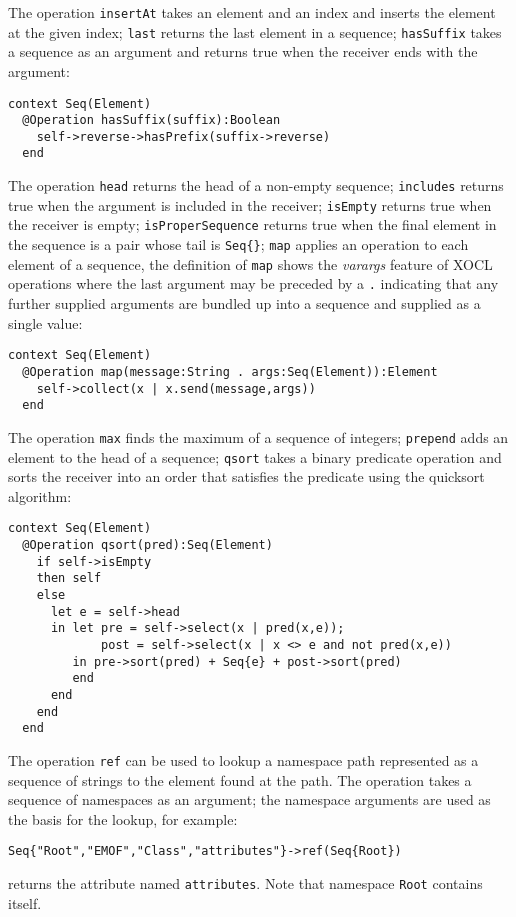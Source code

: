 \documentclass{article}
\begin{document}
The operation {\tt insertAt} takes an element and an index and inserts the element at the given index; 
{\tt last} returns the last element in a sequence; {\tt hasSuffix} takes a sequence as an argument and
returns true when the receiver ends with the argument:
\begin{verbatim}
context Seq(Element)
  @Operation hasSuffix(suffix):Boolean
    self->reverse->hasPrefix(suffix->reverse)
  end
\end{verbatim}
The operation {\tt head} returns the head of a non-empty sequence; {\tt includes} returns true when the 
argument is included in the receiver; {\tt isEmpty} returns true when the receiver is empty; {\tt isProperSequence}
returns true when the final element in the sequence is a pair whose tail is {\tt Seq\{\}}; {\tt map}
applies an operation to each element of a sequence, the definition of {\tt map} shows the {\em varargs} feature
of XOCL operations where the last argument may be preceded by a {\tt .} indicating that any further
supplied arguments are bundled up into a sequence and supplied as a single value:
\begin{verbatim}
context Seq(Element)
  @Operation map(message:String . args:Seq(Element)):Element
    self->collect(x | x.send(message,args))
  end
\end{verbatim}
The operation {\tt max} finds the maximum of a sequence of integers; {\tt prepend} adds an element to 
the head of a sequence; {\tt qsort} takes a binary predicate operation and sorts the receiver into an
order that satisfies the predicate using the quicksort algorithm:
\begin{verbatim}
context Seq(Element)
  @Operation qsort(pred):Seq(Element)
    if self->isEmpty
    then self
    else 
      let e = self->head
      in let pre = self->select(x | pred(x,e));
             post = self->select(x | x <> e and not pred(x,e))
         in pre->sort(pred) + Seq{e} + post->sort(pred)
         end
      end
    end
  end
\end{verbatim}
The operation {\tt ref} can be used to lookup a namespace path represented as a sequence of strings
to the element found at the path. The operation takes a sequence of namespaces as an argument;
the namespace arguments are used as the basis for the lookup, for example:
\begin{verbatim}
Seq{"Root","EMOF","Class","attributes"}->ref(Seq{Root})
\end{verbatim}
returns the attribute named {\tt attributes}. Note that namespace {\tt Root} contains itself.
\end{document}
